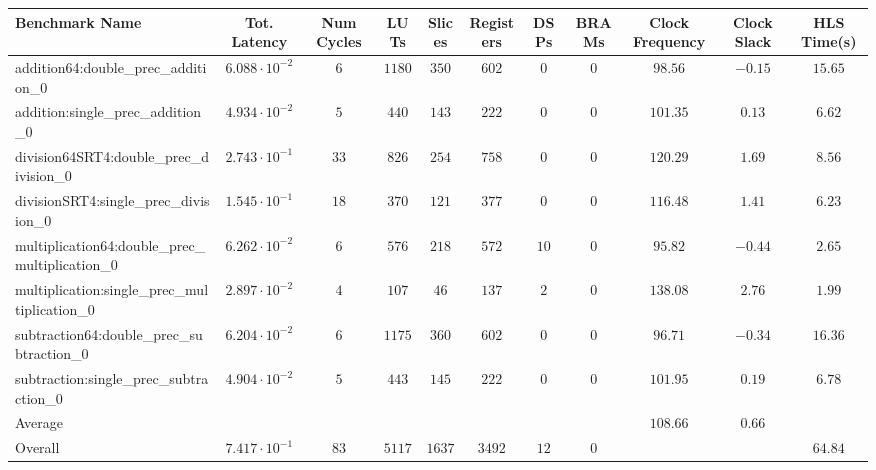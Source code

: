 \begin{tabular}{|l|c|c|c|c|c|c|c|c|c|c|}
\hline
Benchmark Name                                   & Tot. Latency            & Num Cycles & LUTs     & Slices   & Registers & DSPs   & BRAMs & Clock Frequency & Clock Slack & HLS Time(s) \\
\hline
addition64:double\_prec\_addition\_0             & $ 6.088 \cdot 10^{-2} $ & $ 6      $ & $ 1180 $ & $ 350  $ & $ 602   $ & $ 0  $ & $ 0 $ & $ 98.56       $ & $ -0.15   $ & $ 15.65   $ \\
addition:single\_prec\_addition\_0               & $ 4.934 \cdot 10^{-2} $ & $ 5      $ & $ 440  $ & $ 143  $ & $ 222   $ & $ 0  $ & $ 0 $ & $ 101.35      $ & $ 0.13    $ & $ 6.62    $ \\
division64SRT4:double\_prec\_division\_0         & $ 2.743 \cdot 10^{-1} $ & $ 33     $ & $ 826  $ & $ 254  $ & $ 758   $ & $ 0  $ & $ 0 $ & $ 120.29      $ & $ 1.69    $ & $ 8.56    $ \\
divisionSRT4:single\_prec\_division\_0           & $ 1.545 \cdot 10^{-1} $ & $ 18     $ & $ 370  $ & $ 121  $ & $ 377   $ & $ 0  $ & $ 0 $ & $ 116.48      $ & $ 1.41    $ & $ 6.23    $ \\
multiplication64:double\_prec\_multiplication\_0 & $ 6.262 \cdot 10^{-2} $ & $ 6      $ & $ 576  $ & $ 218  $ & $ 572   $ & $ 10 $ & $ 0 $ & $ 95.82       $ & $ -0.44   $ & $ 2.65    $ \\
multiplication:single\_prec\_multiplication\_0   & $ 2.897 \cdot 10^{-2} $ & $ 4      $ & $ 107  $ & $ 46   $ & $ 137   $ & $ 2  $ & $ 0 $ & $ 138.08      $ & $ 2.76    $ & $ 1.99    $ \\
subtraction64:double\_prec\_subtraction\_0       & $ 6.204 \cdot 10^{-2} $ & $ 6      $ & $ 1175 $ & $ 360  $ & $ 602   $ & $ 0  $ & $ 0 $ & $ 96.71       $ & $ -0.34   $ & $ 16.36   $ \\
subtraction:single\_prec\_subtraction\_0         & $ 4.904 \cdot 10^{-2} $ & $ 5      $ & $ 443  $ & $ 145  $ & $ 222   $ & $ 0  $ & $ 0 $ & $ 101.95      $ & $ 0.19    $ & $ 6.78    $ \\
\hline
Average                                          & $                     $ & $        $ & $      $ & $      $ & $       $ & $    $ & $   $ & $ 108.66      $ & $ 0.66    $ & $         $ \\
\hline
Overall                                          & $ 7.417 \cdot 10^{-1} $ & $ 83     $ & $ 5117 $ & $ 1637 $ & $ 3492  $ & $ 12 $ & $ 0 $ & $             $ & $         $ & $ 64.84   $ \\
\hline
\end{tabular}
